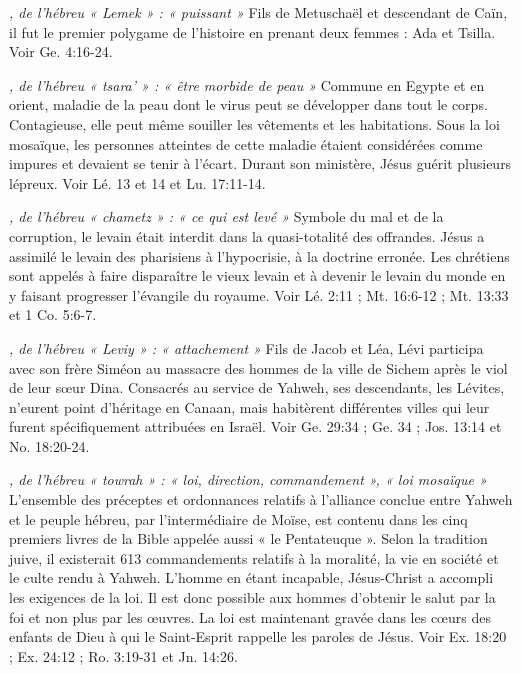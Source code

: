 \begin{multicols}{2}
{\textit{, de l'hébreu « Lemek » : « puissant »}\newline
Fils de Metuschaël et descendant de Caïn, il fut le premier polygame de l'histoire en prenant deux femmes : Ada et Tsilla. Voir Ge. 4:16-24.

\textit{, de l'hébreu « tsara' » : « être morbide de peau »}\newline
Commune en Egypte et en orient, maladie de la peau dont le virus peut se développer dans tout le corps. Contagieuse, elle peut même souiller les vêtements et les habitations. Sous la loi mosaïque, les personnes atteintes de cette maladie étaient considérées comme impures et devaient se tenir à l'écart. Durant son ministère, Jésus guérit plusieurs lépreux. Voir Lé. 13 et 14 et Lu. 17:11-14.

\textit{, de l'hébreu « chametz » : « ce qui est levé »}\newline
Symbole du mal et de la corruption, le levain était interdit dans la quasi-totalité des offrandes. Jésus a assimilé le levain des pharisiens à l'hypocrisie, à la doctrine erronée. Les chrétiens sont appelés à faire disparaître le vieux levain et à devenir le levain du monde en y faisant progresser l'évangile du royaume. Voir Lé. 2:11 ; Mt. 16:6-12 ; Mt. 13:33 et 1 Co. 5:6-7.

\textit{, de l'hébreu « Leviy » : « attachement »}\newline
Fils de Jacob et Léa, Lévi participa avec son frère Siméon au massacre des hommes de la ville de Sichem après le viol de leur sœur Dina. Consacrés au service de Yahweh, ses descendants, les Lévites, n'eurent point d'héritage en Canaan, mais habitèrent différentes villes qui leur furent spécifiquement attribuées en Israël. Voir Ge. 29:34 ; Ge. 34 ; Jos. 13:14 et No. 18:20-24.

\textit{, de l'hébreu « towrah » : « loi, direction, commandement », « loi mosaïque »}\newline
L'ensemble des préceptes et ordonnances relatifs à l'alliance conclue entre Yahweh et le peuple hébreu, par l'intermédiaire de Moïse, est contenu dans les cinq premiers livres de la Bible appelée aussi « le Pentateuque ». Selon la tradition juive, il existerait 613 commandements relatifs à la moralité, la vie en société et le culte rendu à Yahweh. L'homme en étant incapable, Jésus-Christ a accompli les exigences de la loi. Il est donc possible aux hommes d'obtenir le salut par la foi et non plus par les œuvres. La loi est maintenant gravée dans les cœurs des enfants de Dieu à qui le Saint-Esprit rappelle les paroles de Jésus. Voir Ex. 18:20 ; Ex. 24:12 ; Ro. 3:19-31 et Jn. 14:26.

}
\end{multicols}
